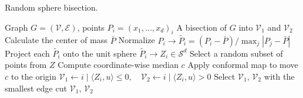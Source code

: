 \begin{algorithm}
    \caption{Random sphere bisection.}
    \label{alg:sphere}
    \begin{algorithmic}[1]
        \Require Graph \( G = (\mathcal{V}, \mathcal{E}) \), points \( P_i = (x_{1}, \dots, x_{d})_i \)
    \Ensure A bisection of \( G \) into \(\mathcal{V}_1\) and \(\mathcal{V}_2\)
        \State Calculate the center of mass \(\bar{P}\)
        \State Normalize \(P_i \rightarrow \tilde{P_i} = (P_i - \bar{P})/\max_j{|P_j - \bar{P}|}\)
        \State Project each \(\tilde{P_i}\) onto the unit sphere \(\tilde{P_i}\rightarrow Z_i \in \mathcal{S}^d\)
            \State Select a random subset of points from \(Z\)
            \State Compute coordinate-wise median \(c\)
            \State Apply conformal map to move \(c\) to the origin
                \State \(\mathcal{V}_1 \gets { i \mid \langle Z_i, u \rangle \leq 0 }, \quad \mathcal{V}_2 \gets { i \mid \langle Z_i, u \rangle > 0 } \)
                \State Select \(\mathcal{V}_1\), \(\mathcal{V}_2\) with the smallest edge cut
            \EndFor
        \EndFor
        \State \Return \(\mathcal{V}_1\), \(\mathcal{V}_2\)
    \EndFunction
    \end{algorithmic}
\end{algorithm}